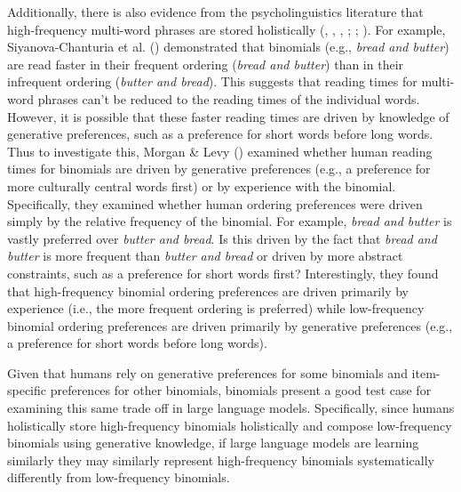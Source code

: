 \documentclass[
  12pt,
  letterpaper,
]{scrreprt}
\begin{document}
Additionally, there is also evidence from the psycholinguistics
literature that high-frequency multi-word phrases are stored
holistically (,
,
,
;
;
). For example, Siyanova-Chanturia et al.
()
demonstrated that binomials (e.g., \emph{bread and butter}) are read
faster in their frequent ordering (\emph{bread and butter}) than in
their infrequent ordering (\emph{butter and bread}). This suggests that
reading times for multi-word phrases can't be reduced to the reading
times of the individual words. However, it is possible that these faster
reading times are driven by knowledge of generative preferences, such as
a preference for short words before long words. Thus to investigate
this, Morgan \& Levy
() examined
whether human reading times for binomials are driven by generative
preferences (e.g., a preference for more culturally central words first)
or by experience with the binomial. Specifically, they examined whether
human ordering preferences were driven simply by the relative frequency
of the binomial. For example, \emph{bread and butter} is vastly
preferred over \emph{butter and bread}. Is this driven by the fact that
\emph{bread and butter} is more frequent than \emph{butter and bread} or
driven by more abstract constraints, such as a preference for short
words first? Interestingly, they found that high-frequency binomial
ordering preferences are driven primarily by experience (i.e., the more
frequent ordering is preferred) while low-frequency binomial ordering
preferences are driven primarily by generative preferences (e.g., a
preference for short words before long words).

Given that humans rely on generative preferences for some binomials and
item-specific preferences for other binomials, binomials present a good
test case for examining this same trade off in large language models.
Specifically, since humans holistically store high-frequency binomials
holistically and compose low-frequency binomials using generative
knowledge, if large language models are learning similarly they may
similarly represent high-frequency binomials systematically differently
from low-frequency binomials.
\end{document}
